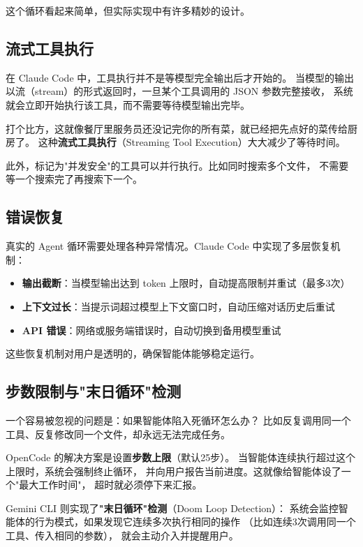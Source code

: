 这个循环看起来简单，但实际实现中有许多精妙的设计。

\subsection{流式工具执行}

在 Claude Code 中，工具执行并不是等模型完全输出后才开始的。
当模型的输出以流（stream）的形式返回时，一旦某个工具调用的 JSON 参数完整接收，
系统就会立即开始执行该工具，而不需要等待模型输出完毕。

打个比方，这就像餐厅里服务员还没记完你的所有菜，就已经把先点好的菜传给厨房了。
这种\textbf{流式工具执行}（Streaming Tool Execution）大大减少了等待时间。

此外，标记为"并发安全"的工具可以并行执行。比如同时搜索多个文件，
不需要等一个搜索完了再搜索下一个。

\subsection{错误恢复}

真实的 Agent 循环需要处理各种异常情况。Claude Code 中实现了多层恢复机制：

\begin{itemize}
    \item \textbf{输出截断}：当模型输出达到 token 上限时，自动提高限制并重试（最多3次）
    \item \textbf{上下文过长}：当提示词超过模型上下文窗口时，自动压缩对话历史后重试
    \item \textbf{API 错误}：网络或服务端错误时，自动切换到备用模型重试
\end{itemize}

这些恢复机制对用户是透明的，确保智能体能够稳定运行。

\subsection{步数限制与"末日循环"检测}

一个容易被忽视的问题是：如果智能体陷入死循环怎么办？
比如反复调用同一个工具、反复修改同一个文件，却永远无法完成任务。

OpenCode 的解决方案是设置\textbf{步数上限}（默认25步）。
当智能体连续执行超过这个上限时，系统会强制终止循环，
并向用户报告当前进度。这就像给智能体设了一个"最大工作时间"，
超时就必须停下来汇报。

Gemini CLI 则实现了\textbf{"末日循环"检测}（Doom Loop Detection）：
系统会监控智能体的行为模式，如果发现它连续多次执行相同的操作
（比如连续3次调用同一个工具、传入相同的参数），
就会主动介入并提醒用户。

